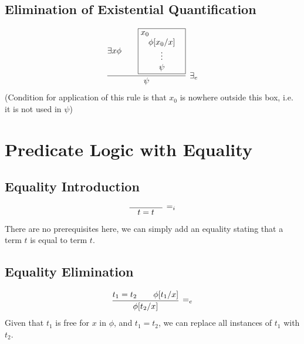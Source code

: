 \documentclass{article}
\newcommand{\rulename}[1]{#1}
\newcommand{\hint}[1]{#1}
\newcommand{\myex}[2]{\exists #1 #2}
\begin{document}
\subsection*{Elimination of Existential Quantification}
    \begin{align*}
      \infer[\rulename{\exists_e}]
      {\psi}
      {
        \myex{x}{\phi} &&
        \framebox{\parbox{1.8cm}{\hint{$x_0$}\\\centerline{$\phi[x_0/x]$}\\\centerline{$\vdots$}\\\centerline{$\psi$}}}
      }
    \end{align*}
    (Condition for application of this rule is that $x_0$ is nowhere outside this box, i.e. it is not used in $\psi$)
\section*{Predicate Logic with Equality}
  \subsection*{Equality Introduction}
    \begin{align*}
      \infer[\rulename{=_i}]
      {\quad t=t \quad}
      {}
    \end{align*}
    There are no prerequisites here, we can simply add an equality stating that a term $t$ is equal to term $t$.
  \subsection*{Equality Elimination}
    \begin{align*}
      \infer[\rulename{=_e}]
      {\phi[t_2/x]}
      {t_1 = t_2 && \phi[t_1/x]}
    \end{align*}
    Given that $t_1$ is free for $x$ in $\phi$, and $t_1 = t_2$, we can replace all instances of $t_1$ with $t_2$.
    
\end{document}
